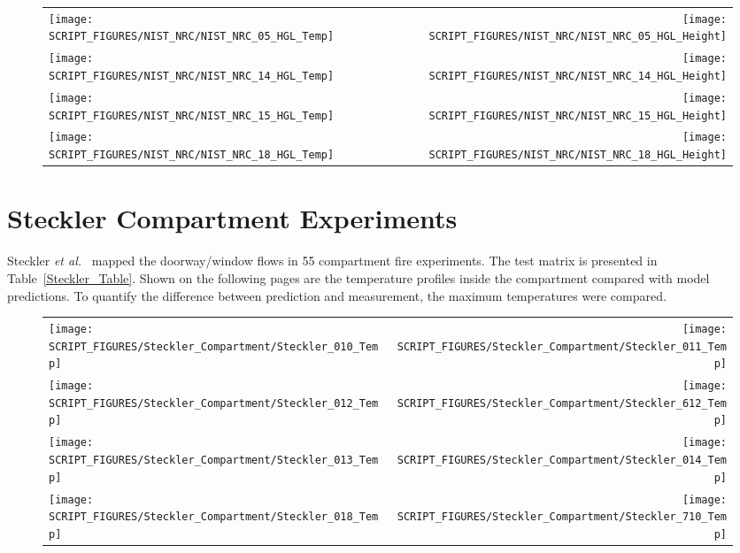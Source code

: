 \begin{figure}[p]
\begin{tabular*}{\textwidth}{l@{\extracolsep{\fill}}r}
\texttt{[image: SCRIPT\_FIGURES/NIST\_NRC/NIST\_NRC\_05\_HGL\_Temp]} &
\texttt{[image: SCRIPT\_FIGURES/NIST\_NRC/NIST\_NRC\_05\_HGL\_Height]} \\
\texttt{[image: SCRIPT\_FIGURES/NIST\_NRC/NIST\_NRC\_14\_HGL\_Temp]} &
\texttt{[image: SCRIPT\_FIGURES/NIST\_NRC/NIST\_NRC\_14\_HGL\_Height]} \\
\texttt{[image: SCRIPT\_FIGURES/NIST\_NRC/NIST\_NRC\_15\_HGL\_Temp]} &
\texttt{[image: SCRIPT\_FIGURES/NIST\_NRC/NIST\_NRC\_15\_HGL\_Height]} \\
\texttt{[image: SCRIPT\_FIGURES/NIST\_NRC/NIST\_NRC\_18\_HGL\_Temp]} &
\texttt{[image: SCRIPT\_FIGURES/NIST\_NRC/NIST\_NRC\_18\_HGL\_Height]}
\end{tabular*}
\end{figure}




\clearpage

\section{Steckler Compartment Experiments}

Steckler {\em et al.}~\cite{Steckler:NBSIR_82-2520} mapped the doorway/window flows in 55 compartment fire experiments. The test matrix is presented in Table~\ref{Steckler_Table}. Shown on the following pages are the temperature profiles inside the compartment compared with model predictions. To quantify the difference between prediction and measurement, the maximum temperatures were compared.

\newpage

\begin{figure}[p]
\begin{tabular*}{\textwidth}{l@{\extracolsep{\fill}}r}
\texttt{[image: SCRIPT\_FIGURES/Steckler\_Compartment/Steckler\_010\_Temp]} &
\texttt{[image: SCRIPT\_FIGURES/Steckler\_Compartment/Steckler\_011\_Temp]} \\
\texttt{[image: SCRIPT\_FIGURES/Steckler\_Compartment/Steckler\_012\_Temp]} &
\texttt{[image: SCRIPT\_FIGURES/Steckler\_Compartment/Steckler\_612\_Temp]} \\
\texttt{[image: SCRIPT\_FIGURES/Steckler\_Compartment/Steckler\_013\_Temp]} &
\texttt{[image: SCRIPT\_FIGURES/Steckler\_Compartment/Steckler\_014\_Temp]} \\
\texttt{[image: SCRIPT\_FIGURES/Steckler\_Compartment/Steckler\_018\_Temp]} &
\texttt{[image: SCRIPT\_FIGURES/Steckler\_Compartment/Steckler\_710\_Temp]}
\end{tabular*}
\label{Steckler_Temp_1}
\end{figure}

